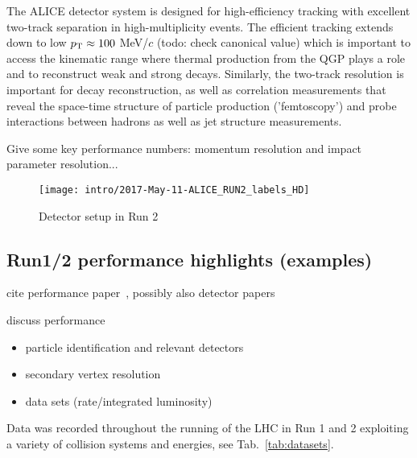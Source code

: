 The ALICE detector system is designed for high-efficiency tracking with excellent two-track separation in high-multiplicity events. The efficient tracking extends down to low $p_{\rm T} \approx 100$ MeV/$c$ (todo: check canonical value) which is important to access the kinematic range where thermal production from the QGP plays a role and to reconstruct weak and strong decays.
Similarly, the two-track resolution is important for decay reconstruction, as well as correlation measurements that reveal the space-time structure of particle production ('femtoscopy') and probe interactions between hadrons as well as jet structure measurements.

Give some key performance numbers: momentum resolution and impact parameter resolution...

\begin{figure}
\centering
\texttt{[image: intro/2017-May-11-ALICE\_RUN2\_labels\_HD]}
\caption{Detector setup in Run 2}
\label{fig:alice_run2}
\end{figure}

\subsection*{Run1/2 performance highlights (examples)}

cite performance paper~\cite{Abelev:2014ffa}, possibly also detector papers

discuss performance
\begin{itemize}
\item particle identification and relevant detectors
\item secondary vertex resolution
\item data sets (rate/integrated luminosity)
\end{itemize}

Data was recorded throughout the
running of the LHC in Run 1 and 2 exploiting a variety of collision systems and
energies, see Tab.~\ref{tab:datasets}.

